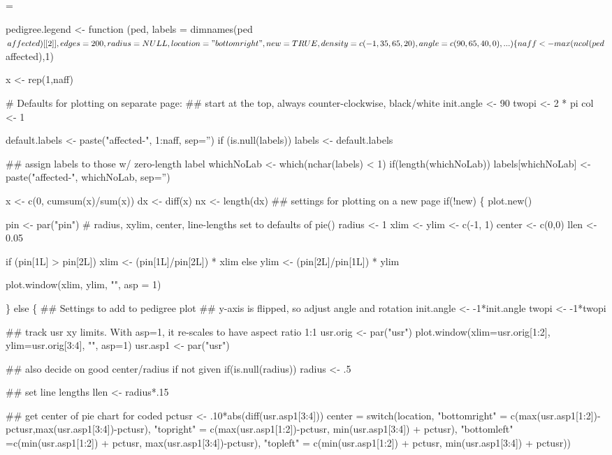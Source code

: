 \documentclass{article}
\begin{document}
\begin{nwchunk}
=
 
 pedigree.legend <- function (ped, labels = dimnames(ped$affected)[[2]],
     edges = 200, radius=NULL, location="bottomright", new=TRUE,
     density=c(-1, 35,65,20),  angle = c(90, 65, 40, 0), ...) 
 \{
    
     naff <- max(ncol(ped$affected),1)
 
     x <- rep(1,naff)
     
     # Defaults for plotting on separate page:
     ## start at the top, always counter-clockwise, black/white
     init.angle <- 90
     twopi <- 2 * pi
     col <- 1
 
     default.labels <- paste("affected-", 1:naff, sep='')
     if (is.null(labels)) labels <- default.labels
     
     ## assign labels to those w/ zero-length label
     whichNoLab <- which(nchar(labels) < 1)
     if(length(whichNoLab))
       labels[whichNoLab] <- paste("affected-", whichNoLab, sep='')
 
     
     x <- c(0, cumsum(x)/sum(x))
     dx <- diff(x)
     nx <- length(dx)
     ## settings for plotting on a new page
     if(!new) \{
       plot.new()
       
       pin <- par("pin")
       # radius, xylim, center, line-lengths set to defaults of pie()
       radius <- 1
       xlim <- ylim <- c(-1, 1)
       center <- c(0,0)
       llen <- 0.05
       
       if (pin[1L] > pin[2L]) 
         xlim <- (pin[1L]/pin[2L]) * xlim
       else ylim <- (pin[2L]/pin[1L]) * ylim
       
       plot.window(xlim, ylim, "", asp = 1)
       
     \} else \{
       ## Settings to add to pedigree plot
       ## y-axis is flipped, so adjust angle and rotation
       init.angle <- -1*init.angle
       twopi <- -1*twopi
 
       ## track usr xy limits. With asp=1, it re-scales to have aspect ratio 1:1
       usr.orig <- par("usr")
       plot.window(xlim=usr.orig[1:2], ylim=usr.orig[3:4], "", asp=1)
       usr.asp1 <- par("usr")
      
       ## also decide on good center/radius if not given
       if(is.null(radius))
         radius <- .5
       
       ## set line lengths
       llen <- radius*.15
       
       ## get center of pie chart for coded
       pctusr <- .10*abs(diff(usr.asp1[3:4]))
       center = switch(location,
         "bottomright" = c(max(usr.asp1[1:2])-pctusr,max(usr.asp1[3:4])-pctusr),
         "topright" = c(max(usr.asp1[1:2])-pctusr, min(usr.asp1[3:4]) + pctusr),
         "bottomleft" =c(min(usr.asp1[1:2]) + pctusr, max(usr.asp1[3:4])-pctusr),
         "topleft" = c(min(usr.asp1[1:2]) + pctusr, min(usr.asp1[3:4]) + pctusr))
      

\end{nwchunk}
\end{document}
